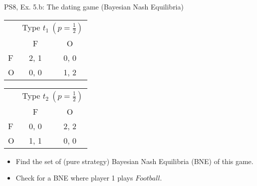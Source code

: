 \begin{frame}{PS8, Ex. 5.b: The dating game (Bayesian Nash Equilibria)}
    \begin{table}
      \begin{tabular}{l|c|c|}
        \multicolumn{1}{c}{} & \multicolumn{2}{c}{Type $t_1\ (p=\frac{1}{2})$} \\
        \multicolumn{1}{c}{} & \multicolumn{1}{c}{F} & \multicolumn{1}{c}{O} \\\cline{2-3}
        F & 2, 1 & 0, 0 \\\cline{2-3}
        O & 0, 0 & 1, 2 \\\cline{2-3}
      \end{tabular}\quad\quad
      \begin{tabular}{l|c|c|}
        \multicolumn{1}{c}{} & \multicolumn{2}{c}{Type $t_2\ (p=\frac{1}{2})$} \\
        \multicolumn{1}{c}{} & \multicolumn{1}{c}{F} & \multicolumn{1}{c}{O} \\\cline{2-3}
        F & 0, 0 & 2, 2 \\\cline{2-3}
        O & 1, 1 & 0, 0 \\\cline{2-3}
      \end{tabular}
    \end{table}
    \begin{itemize}
      \item[(b)] Find the set of (pure strategy) Bayesian Nash Equilibria (BNE) of this game.
    \end{itemize}
    \begin{multicols}{2}
      \begin{itemize}
        \item[Step 1:] Check for a BNE where player 1 plays $Football$.
      \end{itemize}
      \vfill\null\columnbreak
      \vfill\null
    \end{multicols}
\end{frame}
